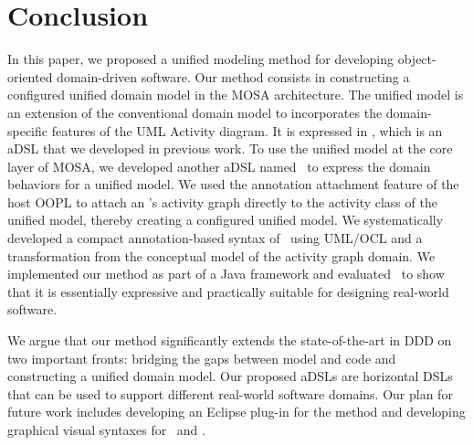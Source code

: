 %
\section{Conclusion}\label{sect:conclusion} %
In this paper, we proposed a unified modeling method for developing object-oriented domain-driven software. Our method consists in constructing a configured unified domain model in the MOSA architecture. The unified model is an extension of the conventional domain model to incorporates the domain-specific features of the UML Activity diagram. It is expressed in \dcsl, which is an aDSL that we developed in previous work. To use the unified model at the core layer of MOSA, we developed another aDSL named \agl~to express the domain behaviors for a unified model. We used the annotation attachment feature of the host OOPL to attach an \agl's activity graph directly to the activity class of the unified model, thereby creating a configured unified model.
We systematically developed a compact annotation-based syntax of \agl~using UML/OCL and a transformation from the conceptual model of the activity graph domain.
%
We implemented our method as part of a Java framework and evaluated \agl~to show that it is essentially expressive and practically suitable for designing real-world software. 

We argue that our method significantly extends the state-of-the-art in DDD on two important fronts: bridging the gaps between model and code and constructing a unified domain model. Our proposed aDSLs are horizontal DSLs that can be used to support different real-world software domains.
%
Our plan for future work includes
developing an Eclipse plug-in for the method and developing graphical visual syntaxes for \dcsl~and \agl.
